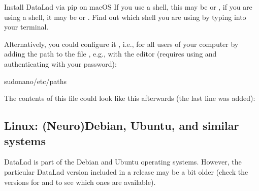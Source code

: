 \begin{findoutmore}[label={fom-macosx-pip}, before title={\thetcbcounter\ }, float, floatplacement=tb, check odd page=true]{Install DataLad via pip on macOS}
\sphinxAtStartPar
If you use a {\hyperref[\detokenize{glossary:term-bash}]{}} shell, this may be  or
, if you are using a {\hyperref[\detokenize{glossary:term-zsh}]{}} shell, it may be
 or . Find out which shell you are using by
typing  into your terminal.

\sphinxAtStartPar
Alternatively, you could configure it , i.e., for all users of
your computer by adding the path
 to the file ,
e.g., with the editor {\hyperref[\detokenize{glossary:term-nano}]{}} (requires using  and authenticating
with your password):

\begin{sphinxVerbatim}[commandchars=\\\{\}]
sudonano/etc/paths
\end{sphinxVerbatim}

\sphinxAtStartPar
The contents of this file could look like this afterwards (the last line was
added):

\begin{sphinxVerbatim}[commandchars=\\\{\}]
\end{sphinxVerbatim}


\end{findoutmore}

\ignorespaces 

\subsection{Linux: (Neuro)Debian, Ubuntu, and similar systems}
\label{\detokenize{intro/installation:linux-neuro-debian-ubuntu-and-similar-systems}}\label{\detokenize{intro/installation:index-9}}
\sphinxAtStartPar
DataLad is part of the Debian and Ubuntu operating systems. However, the
particular DataLad version included in a release may be a bit older (check the
versions for  and  to see which ones are available).

